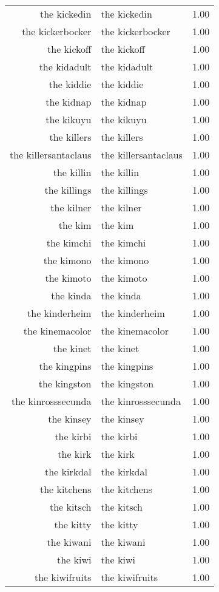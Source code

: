 \begin{table}[ht]
\begin{tabular}{rlr}
  the kickedin & the kickedin & 1.00 \\ 
  the kickerbocker & the kickerbocker & 1.00 \\ 
  the kickoff & the kickoff & 1.00 \\ 
  the kidadult & the kidadult & 1.00 \\ 
  the kiddie & the kiddie & 1.00 \\ 
  the kidnap & the kidnap & 1.00 \\ 
  the kikuyu & the kikuyu & 1.00 \\ 
  the killers & the killers & 1.00 \\ 
  the killersantaclaus & the killersantaclaus & 1.00 \\ 
  the killin & the killin & 1.00 \\ 
  the killings & the killings & 1.00 \\ 
  the kilner & the kilner & 1.00 \\ 
  the kim & the kim & 1.00 \\ 
  the kimchi & the kimchi & 1.00 \\ 
  the kimono & the kimono & 1.00 \\ 
  the kimoto & the kimoto & 1.00 \\ 
  the kinda & the kinda & 1.00 \\ 
  the kinderheim & the kinderheim & 1.00 \\ 
  the kinemacolor & the kinemacolor & 1.00 \\ 
  the kinet & the kinet & 1.00 \\ 
  the kingpins & the kingpins & 1.00 \\ 
  the kingston & the kingston & 1.00 \\ 
  the kinrosssecunda & the kinrosssecunda & 1.00 \\ 
  the kinsey & the kinsey & 1.00 \\ 
  the kirbi & the kirbi & 1.00 \\ 
  the kirk & the kirk & 1.00 \\ 
  the kirkdal & the kirkdal & 1.00 \\ 
  the kitchens & the kitchens & 1.00 \\ 
  the kitsch & the kitsch & 1.00 \\ 
  the kitty & the kitty & 1.00 \\ 
  the kiwani & the kiwani & 1.00 \\ 
  the kiwi & the kiwi & 1.00 \\ 
  the kiwifruits & the kiwifruits & 1.00 \\ 

\end{tabular}
\end{table}
